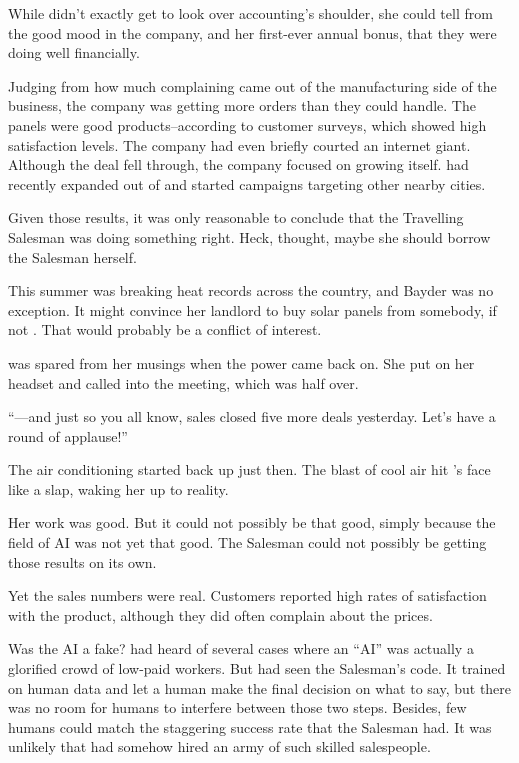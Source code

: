 While {\protag} didn't exactly get to look over accounting's shoulder, she could tell from the good mood in the company, and her first-ever annual bonus, that they were doing well financially.

Judging from how much complaining came out of the manufacturing side of the business, the company was getting more orders than they could handle. The panels were good products--according to customer surveys, which showed high satisfaction levels. The company had even briefly courted an internet giant. Although the deal fell through, the company focused on growing itself. {\energyCompany} had recently expanded out of \crunchyCity{} and started campaigns targeting other nearby cities.

Given those results, it was only reasonable to conclude that the Travelling Salesman was doing something right. Heck, {\protag} thought, maybe she should borrow the Salesman herself.

This summer was breaking heat records across the country, and Bayder was no exception. It might convince her landlord to buy solar panels from somebody, if not {\energyCompany}. That would probably be a conflict of interest.

{\protag} was spared from her musings when the power came back on. She put on her headset and called into the meeting, which was half over.

``---and just so you all know, sales closed five more deals yesterday. Let's have a round of applause!''

The air conditioning started back up just then. The blast of cool air hit {\protag}'s face like a slap, waking her up to reality.

Her work was good. But it could not possibly be that good, simply because the field of AI was not yet that good. The Salesman could not possibly be getting those results on its own.

Yet the sales numbers were real. Customers reported high rates of satisfaction with the product, although they did often complain about the prices.


Was the AI a fake? {\protag} had heard of several cases where an ``AI'' was actually a glorified crowd of low-paid workers. But {\protag} had seen the Salesman's code. It trained on human data and let a human make the final decision on what to say, but there was no room for humans to interfere between those two steps. Besides, few humans could match the staggering success rate that the Salesman had. It was unlikely that {\energyCompany} had somehow hired an army of such skilled salespeople.

